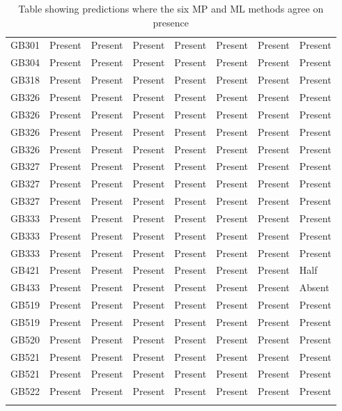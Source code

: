 \begin{longtable}{p{1.5cm}p{2.5cm}p{2.5cm}p{2.5cm}p{2.5cm}p{2.5cm}p{2.5cm}p{2.5cm}}
  GB301 & Present & Present & Present & Present & Present & Present & Present \\ 
  GB304 & Present & Present & Present & Present & Present & Present & Present \\ 
  GB318 & Present & Present & Present & Present & Present & Present & Present \\ 
  GB326 & Present & Present & Present & Present & Present & Present & Present \\ 
  GB326 & Present & Present & Present & Present & Present & Present & Present \\ 
  GB326 & Present & Present & Present & Present & Present & Present & Present \\ 
  GB326 & Present & Present & Present & Present & Present & Present & Present \\ 
  GB327 & Present & Present & Present & Present & Present & Present & Present \\ 
  GB327 & Present & Present & Present & Present & Present & Present & Present \\ 
  GB327 & Present & Present & Present & Present & Present & Present & Present \\ 
  GB333 & Present & Present & Present & Present & Present & Present & Present \\ 
  GB333 & Present & Present & Present & Present & Present & Present & Present \\ 
  GB333 & Present & Present & Present & Present & Present & Present & Present \\ 
  GB421 & Present & Present & Present & Present & Present & Present & Half \\ 
  GB433 & Present & Present & Present & Present & Present & Present & Absent \\ 
  GB519 & Present & Present & Present & Present & Present & Present & Present \\ 
  GB519 & Present & Present & Present & Present & Present & Present & Present \\ 
  GB520 & Present & Present & Present & Present & Present & Present & Present \\ 
  GB521 & Present & Present & Present & Present & Present & Present & Present \\ 
  GB521 & Present & Present & Present & Present & Present & Present & Present \\ 
  GB522 & Present & Present & Present & Present & Present & Present & Present \\ 
   \bottomrule
\caption{Table showing predictions where the six MP and ML methods agree on presence} 
\label{extra_predictions_table}
\end{longtable}
